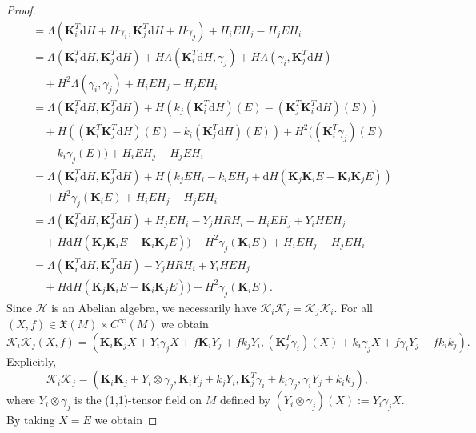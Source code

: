 \documentclass[10pt,a4paper]{amsart}
\newcommand{\bs}{\boldsymbol}
\newcommand{\rd}{\mathrm{d}}
\begin{document}
\begin{proof}
\begin{equation}
\begin{split}
&=\Lambda(\bs{K}_{i}^{T}\rd H+H\gamma_{i},\bs{K}_{j}^{T}\rd H+H\gamma_{j})+H_{i}EH_{j}-H_{j}EH_{i}\\
&=\Lambda(\bs{K}_{i}^{T}\rd H,\bs{K}_{j}^{T}\rd H)+H\Lambda(\bs{K}_{i}^{T}\rd H,\gamma_{j})+H\Lambda(\gamma_{i},\bs{K}_{j}^{T}\rd H)\\
&\quad+H^{2}\Lambda(\gamma_{i},\gamma_{j})+H_{i}EH_{j}-H_{j}EH_{i}\\
&=\Lambda(\bs{K}_{i}^{T}\rd H,\bs{K}_{j}^{T}\rd H)+H(k_{j}(\bs{K}_{i}^{T}\rd H)(E)-(\bs{K}_{j}^{T}\bs{K}_{i}^{T}\rd H)(E))\\
&\quad+H((\bs{K}_{i}^{T}\bs{K}_{j}^{T}\rd H)(E)-k_{i}(\bs{K}_{j}^{T}\rd H)(E))+H^{2}((\bs{K}_{i}^{T}\gamma_{j})(E)\\
&\quad-k_{i}\gamma_{j}(E))+H_{i}EH_{j}-H_{j}EH_{i}\\
&=\Lambda(\bs{K}_{i}^{T}\rd H,\bs{K}_{j}^{T}\rd H)+H(k_{j}EH_{i}-k_{i}EH_{j}+\rd H(\bs{K}_{j}\bs{K}_{i}E-\bs{K}_{i}\bs{K}_{j}E))\\
&\quad+H^{2}\gamma_{j}(\bs{K}_{i}E)+H_{i}EH_{j}-H_{j}EH_{i}\\
&=\Lambda(\bs{K}_{i}^{T}\rd H,\bs{K}_{j}^{T}\rd H)+H_{j}EH_{i}-Y_{j}HRH_{i}-H_{i}EH_{j}+Y_{i}HEH_{j}\\
&\quad+H\rd H(\bs{K}_{j}\bs{K}_{i}E-\bs{K}_{i}\bs{K}_{j}E))+H^{2}\gamma_{j}(\bs{K}_{i}E)+H_{i}EH_{j}-H_{j}EH_{i}\\
&=\Lambda(\bs{K}_{i}^{T}\rd H,\bs{K}_{j}^{T}\rd H)-Y_{j}HRH_{i}+Y_{i}HEH_{j}\\
&\quad+H\rd H(\bs{K}_{j}\bs{K}_{i}E-\bs{K}_{i}\bs{K}_{j}E))+H^{2}\gamma_{j}(\bs{K}_{i}E).
\end{split}
\end{equation}
Since $\mathscr{H}$ is an Abelian algebra, we necessarily have $\bs{\mathcal{K}}_{i}\bs{\mathcal{K}}_{j}=\bs{\mathcal{K}}_{j}\bs{\mathcal{K}}_{i}$. For all $(X,f)\in\mathfrak{X}(M)\times C^{\infty}(M)$ we obtain
\begin{equation}
\bs{\mathcal{K}}_{i}\bs{\mathcal{K}}_{j}(X,f)=(\bs{K}_{i}\bs{K}_{j}X+Y_{i}\gamma_{j}X+f\bs{K}_{i}Y_{j}+fk_{j}Y_{i},(\bs{K}_{j}^{T}\gamma_{i})(X)+k_{i}\gamma_{j}X+f\gamma_{i}Y_{j}+fk_{i}k_{j}).
\end{equation}
Explicitly, 
\begin{equation}
\bs{\mathcal{K}}_{i}\bs{\mathcal{K}}_{j}=(\bs{K}_{i}\bs{K}_{j}+Y_{i}\otimes\gamma_{j},\bs{K}_{i}Y_{j}+k_{j}Y_{i},\bs{K}_{j}^{T}\gamma_{i}+k_{i}\gamma_{j},\gamma_{i}Y_{j}+k_{i}k_{j}),
\end{equation}
where $Y_{i}\otimes\gamma_{j}$ is the (1,1)-tensor field on $M$ defined by $(Y_{i}\otimes\gamma_{j})(X):=Y_{i}\gamma_{j}X$. By taking $X=E$ we obtain

\end{proof}
\end{document}
